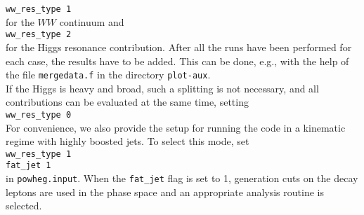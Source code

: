 \documentclass[a4paper,11pt]{article}
\begin{document}
{\tt ww\_res\_type 1}
\\[2ex]
for the $WW$ continuum and
\\[2ex]
{\tt ww\_res\_type 2}
\\[2ex]
for the Higgs resonance contribution. After all the runs have been
performed for each case, the results have to be added. This can be
done, e.g., with the help of the file {\tt mergedata.f} in the
directory {\tt plot-aux}. 
\\[2ex]
If the Higgs is heavy and broad, such a splitting is not necessary,
and all contributions can be evaluated at the same time, setting
\\[2ex]
{\tt ww\_res\_type 0}
\\[2ex]
%
For convenience, we also provide the setup for running the code in a kinematic regime with highly boosted jets. To select this mode, set 
\\[2ex]
{\tt ww\_res\_type 1}
\\
{\tt fat\_jet 1}
\\[2ex]
in {\tt powheg.input}. When the {\tt fat\_jet} flag is set to 1, generation cuts on the decay leptons are used in the 
phase space and an appropriate analysis routine is selected. 
\end{document}

